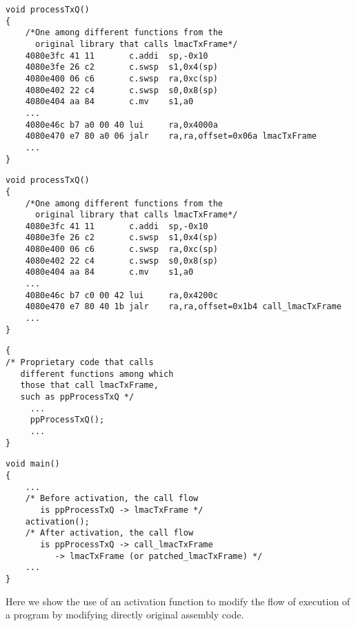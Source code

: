 \newsavebox\funprocesstxq
\begin{lrbox}{\funprocesstxq}
\begin{lstlisting}
void processTxQ()
{
    /*One among different functions from the 
      original library that calls lmacTxFrame*/
    4080e3fc 41 11       c.addi  sp,-0x10
    4080e3fe 26 c2       c.swsp  s1,0x4(sp)
    4080e400 06 c6       c.swsp  ra,0xc(sp)
    4080e402 22 c4       c.swsp  s0,0x8(sp)
    4080e404 aa 84       c.mv    s1,a0
    ... 
    4080e46c b7 a0 00 40 lui     ra,0x4000a
    4080e470 e7 80 a0 06 jalr    ra,ra,offset=0x06a lmacTxFrame 
    ...
}
\end{lstlisting}
\end{lrbox}


\newsavebox\funprocesstxqaft
\begin{lrbox}{\funprocesstxqaft}
\begin{lstlisting}
void processTxQ()
{
    /*One among different functions from the 
      original library that calls lmacTxFrame*/
    4080e3fc 41 11       c.addi  sp,-0x10
    4080e3fe 26 c2       c.swsp  s1,0x4(sp)
    4080e400 06 c6       c.swsp  ra,0xc(sp)
    4080e402 22 c4       c.swsp  s0,0x8(sp)
    4080e404 aa 84       c.mv    s1,a0
    ... 
    4080e46c b7 c0 00 42 lui     ra,0x4200c
    4080e470 e7 80 40 1b jalr    ra,ra,offset=0x1b4 call_lmacTxFrame 
    ...
}
\end{lstlisting}
\end{lrbox}

\newsavebox\funpropcode
\begin{lrbox}{\funpropcode}
\begin{lstlisting}
{
/* Proprietary code that calls 
   different functions among which
   those that call lmacTxFrame,
   such as ppProcessTxQ */
     ...
     ppProcessTxQ();
     ...
}
\end{lstlisting}
\end{lrbox}


\newsavebox\funmain
\begin{lrbox}{\funmain}
\begin{lstlisting}
void main()
{
    ...
    /* Before activation, the call flow
       is ppProcessTxQ -> lmacTxFrame */
    activation();
    /* After activation, the call flow
       is ppProcessTxQ -> call_lmacTxFrame
          -> lmacTxFrame (or patched_lmacTxFrame) */
    ...
}
\end{lstlisting}
\end{lrbox}


Here we show the use of an activation function to 
modify the flow of execution of a program by modifying 
directly original assembly code.

